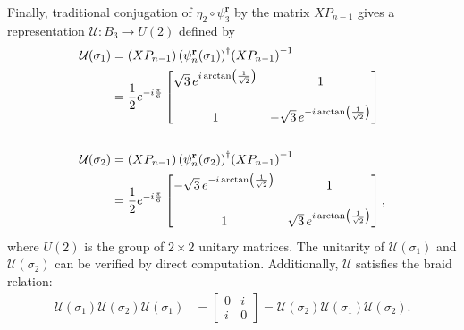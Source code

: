 \begin{example}
    Finally, traditional conjugation of $\eta_2\circ\psi_3^\textbf{r}$ by the matrix $XP_{n-1}$ gives a representation $\mathcal{U}:B_3\to U(2)$ defined by
    \begin{align*}
        \mathcal{U}(\sigma_1) &= \left( X P_{n-1} \right){\left( \psi_n^\mathbf{r} (\sigma_1)\right)}^\dagger{ \left( X P_{n-1} \right) }^{-1} \\
        &= \frac{1}{2}e^{-i\frac{\pi}{6}}\begin{bmatrix}
            \sqrt{3}\,e^{i\arctan\left( \frac{1}{\sqrt{2}} \right)} & 1 \\
            \\
            1 & -\sqrt{3}\,e^{-i\arctan\left( \frac{1}{\sqrt{2}} \right)}
        \end{bmatrix} \\ 
        \\
        \mathcal{U}(\sigma_2) &= \left( X P_{n-1} \right){\left( \psi_n^\mathbf{r} (\sigma_2)\right)}^\dagger{ \left( X P_{n-1} \right) }^{-1} \\
        &= \frac{1}{2}e^{-i\frac{\pi}{6}}\begin{bmatrix}
            -\sqrt{3}\,e^{-i\arctan\left( \frac{1}{\sqrt{2}} \right)} & 1 \\
            \\
            1 & \sqrt{3}\,e^{i\arctan\left( \frac{1}{\sqrt{2}} \right)}
        \end{bmatrix},
    \end{align*}
    where $U(2)$ is the group of $2\times 2$ unitary matrices. The unitarity of $\mathcal{U}(\sigma_1)$ and $\mathcal{U}(\sigma_2)$ can be verified by direct computation. Additionally, $\mathcal{U}$ satisfies the braid relation:
    \begin{align*}
        \mathcal{U}(\sigma_1)\mathcal{U}(\sigma_2)\mathcal{U}(\sigma_1) &= \begin{bmatrix}
            0 & i \\
            i & 0
        \end{bmatrix} = \mathcal{U}(\sigma_2)\mathcal{U}(\sigma_1)\mathcal{U}(\sigma_2).
    \end{align*}


\end{example}
